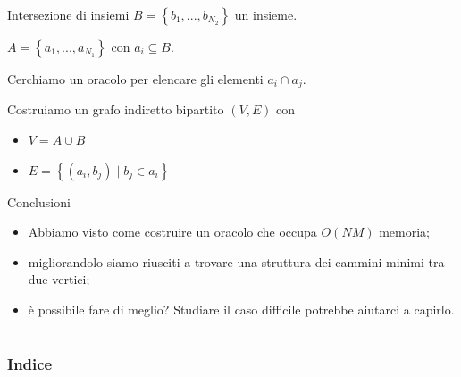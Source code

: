 \documentclass{beamer}
\theoremstyle{plain}
\theoremstyle{definition}
\theoremstyle{remark}
\newcommand{\set}[1]{\left\{#1\right\}}
\newcommand{\pa}[1]{\left(#1\right)}
\begin{document}
\begin{frame}{Intersezione di insiemi}
  $B = \set{ b_1,..., b_{N_2}}$ un insieme.

  $A = \set{ a_1,..., a_{N_1}}$ con $a_i \subseteq B$.

  Cerchiamo un oracolo per elencare gli elementi $a_i \cap a_j$.
  \vfill \pause

  Costruiamo un grafo indiretto bipartito $(V,E)$ con
  \begin{itemize}
  \item $V = A \cup B$
  \item $E = \set{ \pa{a_i, b_j} \mid b_j \in a_i }$
  \end{itemize}
\end{frame}

\begin{frame}{Conclusioni}
  \begin{itemize}
  \item<1-> Abbiamo visto come costruire un oracolo che occupa $O\pa{NM}$
    memoria;
  \item<1-> migliorandolo siamo riusciti a trovare una struttura dei
    cammini minimi tra due vertici;
  \item<2-> \`e possibile fare di meglio? Studiare il caso difficile
    potrebbe aiutarci a capirlo.
  \end{itemize}
\end{frame}


\section*{}

\begin{frame}[plain]
 \frametitle{Indice}
 \tableofcontents
\end{frame}
\end{document}

